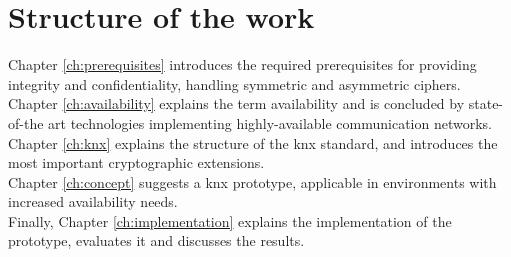 \section{Structure of the work}

Chapter \ref{ch:prerequisites} introduces the required prerequisites for providing integrity and confidentiality, handling symmetric and asymmetric ciphers. 
Chapter \ref{ch:availability} explains the term availability and is concluded by state-of-the art technologies implementing highly-available communication networks.
\\
Chapter \ref{ch:knx} explains the structure of the \gls{knx} standard, and introduces the most important cryptographic extensions.
\\
Chapter \ref{ch:concept} suggests a \gls{knx} prototype, applicable in environments with increased availability needs.
\\
Finally, Chapter \ref{ch:implementation} explains the implementation of the prototype, evaluates it and discusses the results.



